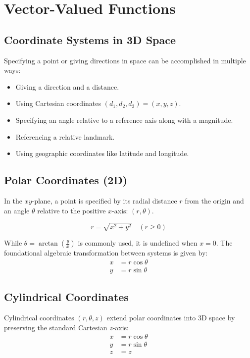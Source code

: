 \section{Vector-Valued Functions}

\subsection{Coordinate Systems in 3D Space}

Specifying a point or giving directions in space can be accomplished in multiple ways:
\begin{itemize}
    \item Giving a direction and a distance.
    \item Using Cartesian coordinates $(d_1, d_2, d_3) = (x, y, z)$.
    \item Specifying an angle relative to a reference axis along with a magnitude.
    \item Referencing a relative landmark.
    \item Using geographic coordinates like latitude and longitude.
\end{itemize}

\subsection{Polar Coordinates (2D)}
In the $xy$-plane, a point is specified by its radial distance $r$ from the origin and an angle $\theta$ relative to the positive $x$-axis: $(r, \theta)$.

\[
r = \sqrt{x^2 + y^2} \quad (r \ge 0)
\]

While $\theta = \arctan\left(\frac{y}{x}\right)$ is commonly used, it is undefined when $x = 0$. The foundational algebraic transformation between systems is given by:
\begin{align*}
x &= r\cos\theta \\
y &= r\sin\theta
\end{align*}


\subsection{Cylindrical Coordinates}
Cylindrical coordinates $(r, \theta, z)$ extend polar coordinates into 3D space by preserving the standard Cartesian $z$-axis:
\begin{align*}
x &= r\cos\theta \\
y &= r\sin\theta \\
z &= z
\end{align*}

